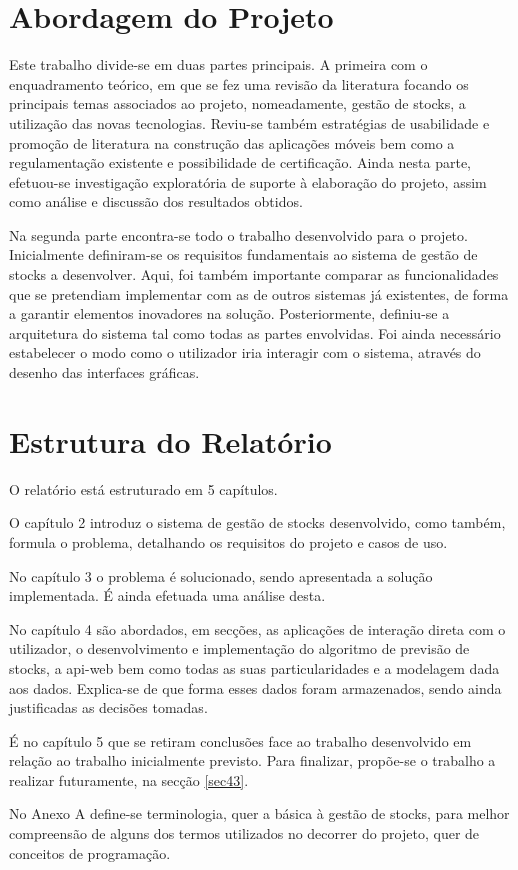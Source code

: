 %
%
\section{Abordagem do Projeto} \label{sec13}

Este trabalho divide-se em duas partes principais. A primeira com o enquadramento teórico, em que se fez uma revisão da literatura focando os principais temas associados ao projeto, nomeadamente, gestão de stocks, a utilização das novas tecnologias. Reviu-se também estratégias de usabilidade e promoção de literatura na construção das aplicações móveis bem como a regulamentação existente e possibilidade de certificação.
Ainda nesta parte, efetuou-se investigação exploratória de suporte à elaboração do projeto, assim como análise e discussão dos resultados obtidos.

Na segunda parte encontra-se todo o trabalho desenvolvido para o projeto. Inicialmente definiram-se os requisitos fundamentais ao sistema de gestão de stocks a desenvolver. Aqui, foi também importante comparar as funcionalidades que se pretendiam implementar com as de outros sistemas já existentes, de forma a garantir elementos inovadores na solução. Posteriormente, definiu-se a arquitetura do sistema tal como todas as partes envolvidas. Foi ainda necessário estabelecer o modo como o utilizador iria interagir com o sistema, através do desenho das interfaces gráficas.

%
%
\section{Estrutura do Relatório} \label{sec14}
O relatório está estruturado em 5 capítulos.

O capítulo 2 introduz o sistema de gestão de stocks desenvolvido, como também, formula o problema, detalhando os requisitos do projeto e casos de uso. 

No capítulo 3 o problema é solucionado, sendo apresentada a solução implementada. É ainda efetuada uma análise desta.

No capítulo 4 são abordados, em secções, as aplicações de interação direta com o utilizador, o desenvolvimento e implementação do algoritmo de previsão de stocks, a \gls{api-web} bem como todas as suas particularidades e a modelagem dada aos dados. Explica-se de que forma esses dados foram armazenados, sendo ainda justificadas as decisões tomadas. 

É no capítulo 5 que se retiram conclusões face ao trabalho desenvolvido em relação ao trabalho inicialmente previsto. Para finalizar, propõe-se o trabalho a realizar futuramente, na secção \ref{sec43}.

No Anexo A define-se terminologia, quer a básica à gestão de stocks, para melhor compreensão de alguns dos termos utilizados no decorrer do projeto, quer de conceitos de programação.

